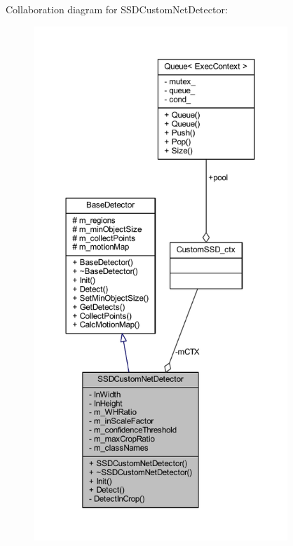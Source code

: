 Collaboration diagram for S\+S\+D\+Custom\+Net\+Detector\+:\nopagebreak
\begin{figure}[H]
\begin{center}
\leavevmode
\includegraphics[height=550pt]{class_s_s_d_custom_net_detector__coll__graph}
\end{center}
\end{figure}

